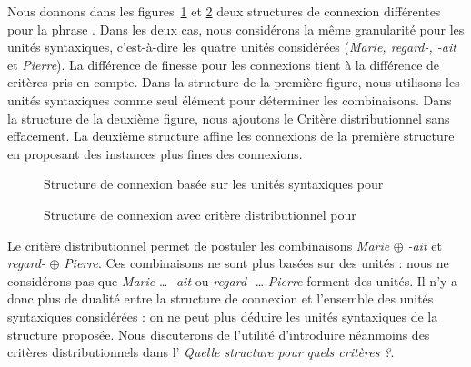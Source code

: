 {\begin{sloppypar}
Nous donnons dans les figures~\ref{fig:regardait1} et \ref{fig:regardait2} deux structures de connexion différentes pour la phrase .
Dans les deux cas, nous considérons la même granularité pour les unités syntaxiques, c'est-à-dire les quatre unités considérées (\textit{Marie, regard-, -ait} et \textit{Pierre}). La différence de finesse pour les connexions tient à la différence de critères pris en compte.
Dans la structure de la première figure, nous utilisons les unités syntaxiques comme seul élément pour déterminer les combinaisons. Dans la structure de la deuxième figure, nous ajoutons le Critère distributionnel sans effacement. La deuxième structure affine les connexions de la première structure en proposant des instances plus fines des connexions.
\end{sloppypar}

\begin{figure}[H]
\caption{Structure de connexion basée sur les unités syntaxiques pour }
\label{fig:regardait1}
\end{figure}

\begin{figure}[H]
\caption{Structure de connexion avec critère distributionnel pour }
\label{fig:regardait2}
\end{figure}

Le critère distributionnel permet de postuler  les combinaisons \textit{Marie} ${\oplus}$ \textit{-ait} et \textit{regard-} ${\oplus}$ \textit{Pierre}. Ces combinaisons ne sont plus basées sur des unités : nous ne considérons pas que \textit{Marie} … \textit{-ait} ou \textit{regard-} … \textit{Pierre} forment des unités. Il n’y a donc plus de dualité entre la structure de connexion et l’ensemble des unités syntaxiques considérées : on ne peut plus déduire les unités syntaxiques de la structure proposée. Nous discuterons de l'utilité d'introduire néanmoins des critères distributionnels dans l' \textit{Quelle structure pour quels critères ?}.

}
